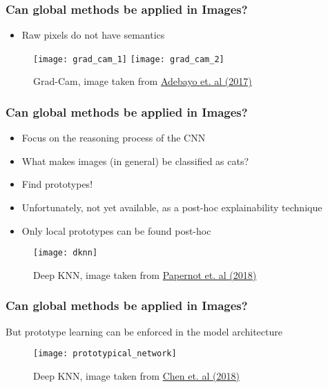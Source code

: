 \begin{frame}
    \frametitle{Can global methods be applied in Images?}
    \begin{itemize}
        \item Raw pixels do not have semantics
    \end{itemize}
    \begin{figure}
        \centering
        \texttt{[image: grad\_cam\_1]}
        \texttt{[image: grad\_cam\_2]}
        \caption{Grad-Cam, image taken from \href{https://arxiv.org/pdf/1610.02391.pdf}{Adebayo et. al (2017)}}
    \end{figure}
\end{frame}


\begin{frame}
    \frametitle{Can global methods be applied in Images?}
    \begin{itemize}
        \item Focus on the reasoning process of the CNN
        \item What makes images (in general) be classified as cats?
        \item Find prototypes!
        \item Unfortunately, not yet available, as a post-hoc explainability technique
        \item Only local prototypes can be found post-hoc
    \end{itemize}

    \begin{figure}
        \centering
        \texttt{[image: dknn]}
        \caption{Deep KNN, image taken from \href{https://arxiv.org/pdf/1803.04765.pdf}{Papernot et. al (2018)}}
    \end{figure}

\end{frame}


\begin{frame}
    \frametitle{Can global methods be applied in Images?}
    But prototype learning can be enforced in the model architecture
    \begin{figure}
        \centering
        \texttt{[image: prototypical\_network]}
        \caption{Deep KNN, image taken from \href{https://arxiv.org/pdf/1806.10574.pdf}{Chen et. al (2018)}}
    \end{figure}
\end{frame}


